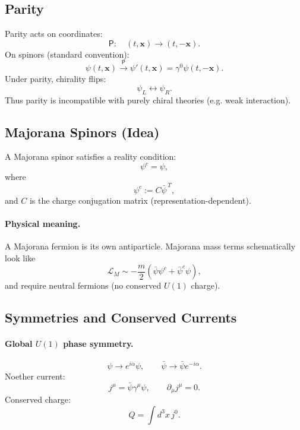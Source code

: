 \subsection{Parity}
Parity acts on coordinates:
\begin{equation}
\mathsf{P}:\quad (t,\mathbf{x})\to (t,-\mathbf{x}).
\end{equation}
On spinors (standard convention):
\begin{equation}
\psi(t,\mathbf{x})\xrightarrow{\mathsf{P}}
\psi'(t,\mathbf{x})=\gamma^0\psi(t,-\mathbf{x}).
\end{equation}
Under parity, chirality flips:
\begin{equation}
\psi_L \leftrightarrow \psi_R.
\end{equation}
Thus parity is incompatible with purely chiral theories (e.g. weak interaction).

\subsection{Majorana Spinors (Idea)}
A Majorana spinor satisfies a reality condition:
\begin{equation}
\psi^c=\psi,
\end{equation}
where
\begin{equation}
\psi^c := C\bar{\psi}^{\,T},
\end{equation}
and $C$ is the charge conjugation matrix (representation-dependent).

\paragraph{Physical meaning.}
A Majorana fermion is its own antiparticle.
Majorana mass terms schematically look like
\begin{equation}
\mathcal{L}_M \sim -\frac{m}{2}\left(\bar{\psi}\psi^c+\bar{\psi}^c\psi\right),
\end{equation}
and require neutral fermions (no conserved $U(1)$ charge).

\subsection{Symmetries and Conserved Currents}
\paragraph{Global $U(1)$ phase symmetry.}
\begin{equation}
\psi \to e^{i\alpha}\psi,
\qquad
\bar{\psi}\to \bar{\psi}e^{-i\alpha}.
\end{equation}
Noether current:
\begin{equation}
j^\mu=\bar{\psi}\gamma^\mu\psi,
\qquad
\partial_\mu j^\mu=0.
\end{equation}
Conserved charge:
\begin{equation}
Q=\int d^3x\, j^0.
\end{equation}

